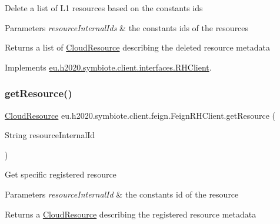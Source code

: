 Delete a list of L1 resources based on the constants ids


\begin{DoxyParams}{Parameters}
{\em resource\+Internal\+Ids} & the constants ids of the resources \\
\hline
\end{DoxyParams}
\begin{DoxyReturn}{Returns}
a list of \hyperlink{}{Cloud\+Resource} describing the deleted resource metadata 
\end{DoxyReturn}


Implements \hyperlink{interfaceeu_1_1h2020_1_1symbiote_1_1client_1_1interfaces_1_1RHClient_a69bba5fe6031648cc2636866cfe6f103}{eu.\+h2020.\+symbiote.\+client.\+interfaces.\+R\+H\+Client}.

\mbox{\label{classeu_1_1h2020_1_1symbiote_1_1client_1_1feign_1_1FeignRHClient_afeca18b59c770a4ce9789f4d7cfd31ab}} 
\subsubsection{\texorpdfstring{get\+Resource()}{getResource()}}
{\footnotesize\ttfamily \hyperlink{classeu_1_1h2020_1_1symbiote_1_1cloud_1_1model_1_1internal_1_1CloudResource}{Cloud\+Resource} eu.\+h2020.\+symbiote.\+client.\+feign.\+Feign\+R\+H\+Client.\+get\+Resource (\begin{DoxyParamCaption}\item[{String}]{resource\+Internal\+Id }\end{DoxyParamCaption})}

Get specific registered resource


\begin{DoxyParams}{Parameters}
{\em resource\+Internal\+Id} & the constants id of the resource \\
\hline
\end{DoxyParams}
\begin{DoxyReturn}{Returns}
a \hyperlink{}{Cloud\+Resource} describing the registered resource metadata 
\end{DoxyReturn}


